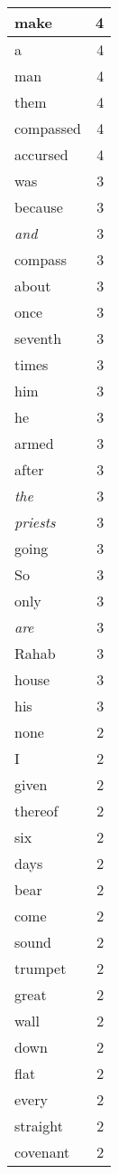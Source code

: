 \begin{center}
\begin{longtable}{l|r}
make & 4 \\ \hline
a & 4 \\ \hline
man & 4 \\ \hline
them & 4 \\ \hline
compassed & 4 \\ \hline
accursed & 4 \\ \hline
was & 3 \\ \hline
because & 3 \\ \hline
\emph{and} & 3 \\ \hline
compass & 3 \\ \hline
about & 3 \\ \hline
once & 3 \\ \hline
seventh & 3 \\ \hline
times & 3 \\ \hline
him & 3 \\ \hline
he & 3 \\ \hline
armed & 3 \\ \hline
after & 3 \\ \hline
\emph{the} & 3 \\ \hline
\emph{priests} & 3 \\ \hline
going & 3 \\ \hline
So & 3 \\ \hline
only & 3 \\ \hline
\emph{are} & 3 \\ \hline
Rahab & 3 \\ \hline
house & 3 \\ \hline
his & 3 \\ \hline
none & 2 \\ \hline
I & 2 \\ \hline
given & 2 \\ \hline
thereof & 2 \\ \hline
six & 2 \\ \hline
days & 2 \\ \hline
bear & 2 \\ \hline
come & 2 \\ \hline
sound & 2 \\ \hline
trumpet & 2 \\ \hline
great & 2 \\ \hline
wall & 2 \\ \hline
down & 2 \\ \hline
flat & 2 \\ \hline
every & 2 \\ \hline
straight & 2 \\ \hline
covenant & 2 \\ \hline

\end{longtable}
\end{center}
